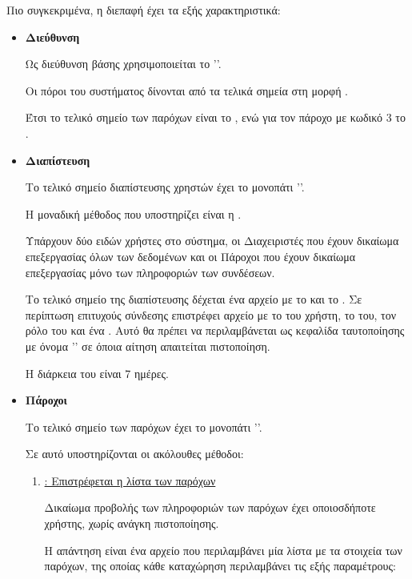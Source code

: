 Πιο συγκεκριμένα, η διεπαφή έχει τα εξής χαρακτηριστικά:

\begin{itemize}
    \item \textbf{Διεύθυνση}
    
    Ως διεύθυνση βάσης χρησιμοποιείται το ''.

    Οι πόροι του συστήματος δίνονται από τα τελικά σημεία στη μορφή .

    Έτσι το τελικό σημείο των παρόχων είναι το ,
    ενώ για τον πάροχο με κωδικό 3 το .

    \item \textbf{Διαπίστευση} 
    
    Το τελικό σημείο διαπίστευσης χρηστών έχει το μονοπάτι ''.

    Η μοναδική μέθοδος που υποστηρίζει είναι η .

    Υπάρχουν δύο ειδών χρήστες στο σύστημα,
    οι Διαχειριστές που έχουν δικαίωμα επεξεργασίας όλων των δεδομένων
    και οι Πάροχοι που έχουν δικαίωμα επεξεργασίας μόνο των πληροφοριών των συνδέσεων.

    Το τελικό σημείο της διαπίστευσης δέχεται ένα αρχείο  με το  και το .
    Σε περίπτωση επιτυχούς σύνδεσης επιστρέφει αρχείο  με το  του χρήστη,
    το  του, τον ρόλο του και ένα .
    Αυτό θα πρέπει να περιλαμβάνεται ως κεφαλίδα ταυτοποίησης με όνομα ''
    σε όποια αίτηση απαιτείται πιστοποίηση.

    Η διάρκεια του  είναι 7 ημέρες.

    \item \textbf{Πάροχοι}
    
    Το τελικό σημείο των παρόχων έχει το μονοπάτι ''.

    Σε αυτό υποστηρίζονται οι ακόλουθες μέθοδοι:

    \begin{enumerate}
        \item \underline{\textbf{}: Επιστρέφεται η λίστα των παρόχων}
        
        Δικαίωμα προβολής των πληροφοριών των παρόχων έχει οποιοσδήποτε χρήστης,
        χωρίς ανάγκη πιστοποίησης.

        Η απάντηση είναι ένα αρχείο  που περιλαμβάνει μία λίστα με τα στοιχεία των παρόχων,
        της οποίας κάθε καταχώρηση περιλαμβάνει τις εξής παραμέτρους:


\end{enumerate}
\end{itemize}
